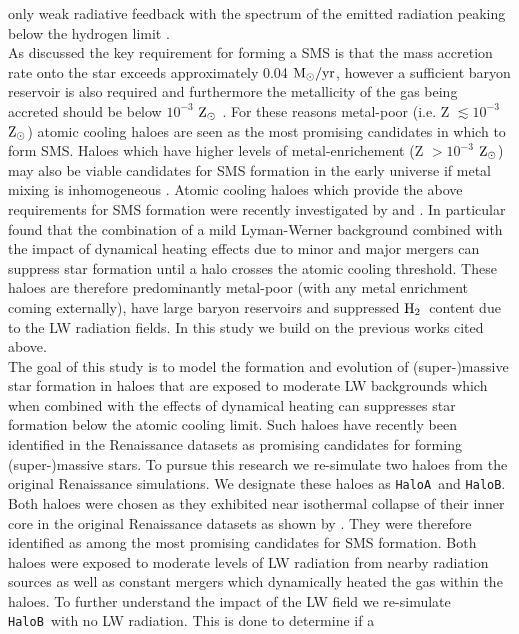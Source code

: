 \documentclass[graphics, twocolumn, usenatbib]{mn2e}
\newcommand{\msolaryrc} {$\rm{M_{\odot}/yr}$}
\newcommand{\zsolar} {$\rm{Z_{\odot}}~$}
\newcommand{\zsolarc} {$\rm{Z_{\odot}}$}
\newcommand{\molH} {$\rm{H_2}$~}
\newcommand{\ha} {\texttt{HaloA~}}
\newcommand{\hb} {\texttt{HaloB~}}
\newcommand{\hbc} {\texttt{HaloB}}
\begin{document}
only weak radiative feedback with the spectrum of the emitted radiation peaking below the hydrogen limit \citep{Woods_2018}. \\
\indent As discussed the key requirement for
forming a SMS is that the mass accretion rate onto the star exceeds approximately 0.04 \msolaryrc, however a sufficient baryon reservoir is also required and furthermore the metallicity of the gas being accreted should be below 
$10^{-3}$ \zsolar \citep{Chon_2020}. For these reasons metal-poor (i.e. Z $\lesssim 10^{-3}$ \zsolarc) atomic cooling haloes are seen as the most 
promising candidates in which to form SMS. Haloes which have higher levels of 
metal-enrichement (Z $> 10^{-3}$ \zsolarc) may also be viable candidates for 
SMS formation in the early universe if metal mixing is inhomogeneous \citep{Regan_2020a}. Atomic cooling haloes which provide the above requirements for SMS formation were recently investigated by \cite{Wise_2019} and \cite{Regan_2020}. In particular \cite{Wise_2019} found that the combination 
of a mild Lyman-Werner background combined with the impact of dynamical heating effects due to minor and major mergers can suppress star formation until a halo crosses the atomic cooling threshold. These haloes are therefore predominantly metal-poor (with any metal enrichment coming externally), have large 
baryon reservoirs and suppressed \molH content due to the LW radiation fields. 
In this study we build on the previous works cited above. \\
\indent The goal of this study is to model the formation and evolution of (super-)massive star
  formation in haloes that are exposed to moderate LW backgrounds which when combined with the effects
  of dynamical heating can suppresses star formation below the atomic cooling limit.
  Such haloes have recently been identified in the Renaissance datasets \citep{Wise_2019, Regan_2020}
  as promising candidates for forming (super-)massive stars.  To pursue this research we re-simulate
  two haloes from the original Renaissance simulations. We designate
  these haloes as \ha and \hbc. Both haloes were chosen as they exhibited near isothermal
  collapse of their inner core in the original Renaissance datasets as shown by \cite{Regan_2020}.
  They were therefore identified as among the most promising candidates for SMS formation. Both
  haloes were exposed to moderate levels of LW radiation from nearby radiation sources as well as
  constant mergers which dynamically heated the gas within the haloes. To further understand the
  impact of the LW field we re-simulate \hb with no LW radiation. This is done to determine if a
\end{document}
